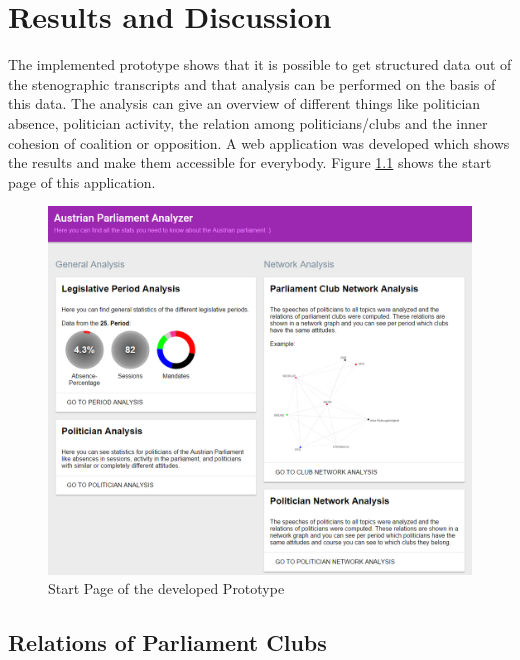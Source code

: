 \chapter{Results and Discussion}
\label{chap:evaluation}

The implemented prototype shows that it is possible to get structured data out of the stenographic transcripts and that analysis can be performed on the basis of this data. The analysis can give an overview of different things like politician absence, politician activity, the relation among politicians/clubs and the inner cohesion of coalition or opposition. A web application was developed which shows the results and make them accessible for everybody. Figure \ref{fig:start_page_prototype} shows the start page of this application.

\begin{figure}[h]
	\includegraphics[width=\textwidth]{imgs/result_start_page}
	\caption{Start Page of the developed Prototype}
	\label{fig:start_page_prototype}
\end{figure}

\section{Relations of Parliament Clubs}
\label{sec:relations_clubs}

